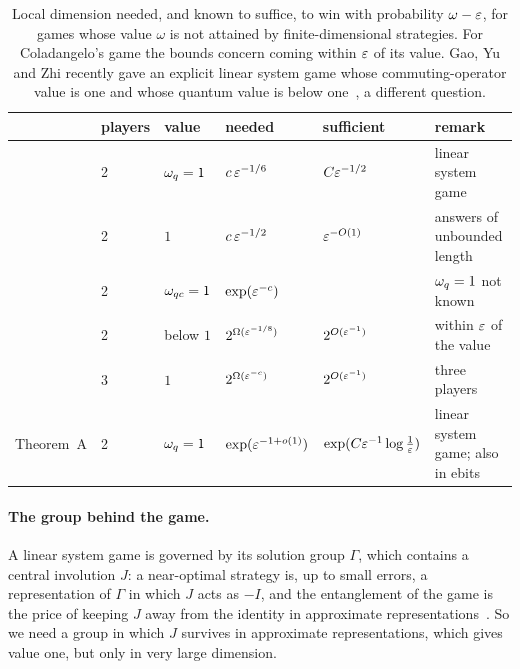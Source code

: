 \begin{table}[t]
\centering
\footnotesize\setlength{\tabcolsep}{3.5pt}%
\begin{tabular}{@{}llllll@{}}
\toprule
 & players & value & needed & sufficient & remark \\
\midrule
\cite{SV18} & 2 & $\omega_{q}=1$ & $c\,\varepsilon^{-1/6}$ & $C\varepsilon^{-1/2}$ & linear system game \\
\cite{MV15} & 2 & $1$ & $c\,\varepsilon^{-1/2}$ & $\varepsilon^{-O(1)}$ & answers of unbounded length \\
\cite{Slo18} & 2 & $\omega_{qc}=1$ & $\exp(\varepsilon^{-c})$ & & $\omega_{q}=1$ not known \\
\cite{Col20} & 2 & below $1$ & $2^{\Omega(\varepsilon^{-1/8})}$ & $2^{O(\varepsilon^{-1})}$ & within $\varepsilon$ of the value \\
\cite{JLV20} & 3 & $1$ & $2^{\Omega(\varepsilon^{-c})}$ & $2^{O(\varepsilon^{-1})}$ & three players \\
\midrule
Theorem~A & 2 & $\omega_{q}=1$ & $\exp(\varepsilon^{-1+o(1)})$ & $\exp(C\varepsilon^{-1}\log\frac1{\varepsilon})$ & linear system game; also in ebits \\
\bottomrule
\end{tabular}
\caption{Local dimension needed, and known to suffice, to win with probability $\omega-\varepsilon$, for games whose value $\omega$ is not attained
by finite-dimensional strategies. For Coladangelo's game the bounds concern coming within $\varepsilon$ of its value.
Gao, Yu and Zhi recently gave an explicit linear system game whose commuting-operator
value is one and whose quantum value is below one~\cite{GYZ26}, a different question.}
\label{tab:known}
\end{table}

\paragraph{The group behind the game.} A linear system game is governed by its solution group $\Gamma$, which contains a central involution
$J$: a near-optimal strategy is, up to small errors, a representation of $\Gamma$ in which $J$ acts as $-I$, and the entanglement of the
game is the price of keeping $J$ away from the identity in approximate representations~\cite{SV18}. So we need a group in which $J$ survives
in approximate representations, which gives value one, but only in very large dimension.

